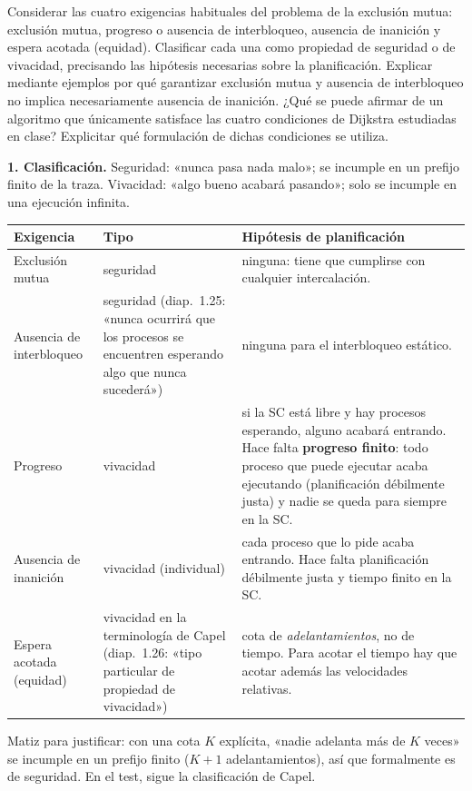 \documentclass[11pt,a4paper,oneside]{report}
\begin{document}
\begin{ejercicio}
Considerar las cuatro exigencias habituales del problema de la exclusión mutua: exclusión mutua, progreso o
ausencia de interbloqueo, ausencia de inanición y espera acotada (equidad). Clasificar cada una como propiedad de
seguridad o de vivacidad, precisando las hipótesis necesarias sobre la planificación. Explicar mediante ejemplos
por qué garantizar exclusión mutua y ausencia de interbloqueo no implica necesariamente ausencia de inanición.
¿Qué se puede afirmar de un algoritmo que únicamente satisface las cuatro condiciones de Dijkstra estudiadas en
clase? Explicitar qué formulación de dichas condiciones se utiliza.
\end{ejercicio}
\begin{solucion}
\textbf{1. Clasificación.} Seguridad: «nunca pasa nada malo»; se incumple en un prefijo finito de la traza.
Vivacidad: «algo bueno acabará pasando»; solo se incumple en una ejecución infinita.
\begin{center}\small
\begin{tabular}{p{3.0cm}p{3.0cm}p{7.0cm}}
\toprule
\textbf{Exigencia} & \textbf{Tipo} & \textbf{Hipótesis de planificación} \\ \midrule
Exclusión mutua & seguridad & ninguna: tiene que cumplirse con cualquier intercalación. \\
Ausencia de interbloqueo & seguridad (diap.\ 1.25: «nunca ocurrirá que los procesos se encuentren esperando algo que nunca sucederá») & ninguna para el interbloqueo estático. \\
Progreso & vivacidad & si la SC está libre y hay procesos esperando, alguno acabará entrando. Hace falta
\textbf{progreso finito}: todo proceso que puede ejecutar acaba ejecutando (planificación débilmente justa) y
nadie se queda para siempre en la SC. \\
Ausencia de inanición & vivacidad (individual) & cada proceso que lo pide acaba entrando. Hace falta
planificación débilmente justa y tiempo finito en la SC. \\
Espera acotada (equidad) & vivacidad en la terminología de Capel (diap.\ 1.26: «tipo particular de propiedad de
vivacidad») & cota de \emph{adelantamientos}, no de tiempo. Para acotar el tiempo hay que acotar además las
velocidades relativas. \\
\bottomrule
\end{tabular}
\end{center}
Matiz para justificar: con una cota $K$ explícita, «nadie adelanta más de $K$ veces» se incumple en un prefijo
finito ($K+1$ adelantamientos), así que formalmente es de seguridad. En el test, sigue la clasificación de Capel.


\end{solucion}
\end{document}
